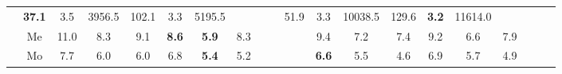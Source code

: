 \documentclass[french,10pt]{article}
\begin{document}
\begin{landscape}
\begin{longtable}{ l  c | c c c | c c c | c c c | c c c | c c c | c c c | }
                    &                     \textbf{ 37.1}
     & {\footnotesize     3.5
    } & {\footnotesize     3956.5
     }
    
    
                    &                     102.1
     & {\footnotesize     3.3
    } & {\footnotesize     5195.5
     }
    
    
                    & & &

                    &                     51.9
     & {\footnotesize     3.3
    } & {\footnotesize     10038.5
     }
    
    
                    &                     129.6
     & {\footnotesize     \textbf{ 3.2}
    } & {\footnotesize     11614.0
     }
    
    
                    & & &

                    \\*
                        & {\small Me  }

                    &                     11.0
     & {\footnotesize     8.3
    } & {\footnotesize     9.1
     }
    
    
                    &                     \textbf{ 8.6}
     & {\footnotesize     \textbf{ 5.9}
    } & {\footnotesize     8.3
     }
    
    
                    & & &

                    &                     9.4
     & {\footnotesize     7.2
    } & {\footnotesize     7.4
     }
    
    
                    &                     9.2
     & {\footnotesize     6.6
    } & {\footnotesize     7.9
     }
    
    
                    & & &

                    \\*
                        & {\small Mo  }

                    &                     7.7
     & {\footnotesize     6.0
    } & {\footnotesize     6.0
     }
    
    
                    &                     6.8
     & {\footnotesize     \textbf{ 5.4}
    } & {\footnotesize     5.2
     }
    
    
                    & & &

                    &                     \textbf{ 6.6}
     & {\footnotesize     5.5
    } & {\footnotesize     4.6
     }
    
    
                    &                     6.9
     & {\footnotesize     5.7
    } & {\footnotesize     4.9
     }
    

\end{longtable}
\end{landscape}
\end{document}
